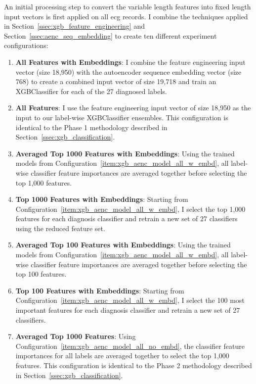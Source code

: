 \documentclass[\main/thesis.tex]{subfiles}
\begin{document}
An initial processing step to convert the variable length features into fixed length input vectors is first applied on all \gls{ecg} records.
I combine the techniques applied in Section~\ref{ssec:xgb_feature_engineering} and Section~\ref{ssec:aenc_seq_embedding} to create ten different experiment configurations:
\begin{enumerate}
    \item \label{item:xgb_aenc_model_all_w_embd} \textbf{All Features with Embeddings}: I combine the feature engineering input vector (size 18,950) with the autoencoder sequence embedding vector (size 768) to create a combined input vector of size 19,718 and train an XGBClassifier for each of the 27 diagnosed labels.
    \item \label{item:xgb_aenc_model_all_no_embd} \textbf{All Features}: I use the feature engineering input vector of size 18,950 as the input to our label-wise XGBClassifier ensembles. This configuration is identical to the Phase 1 methodology described in Section~\ref{ssec:xgb_classification}.
    \item \label{item:xgb_aenc_model_avgd_top_1000_w_embd} \textbf{Averaged Top 1000 Features with Embeddings}: Using the trained models from Configuration~\ref{item:xgb_aenc_model_all_w_embd}, all label-wise classifier feature importances are averaged together before selecting the top 1,000 features.
    \item \label{item:xgb_aenc_model_top_1000_w_embd} \textbf{Top 1000 Features with Embeddings}: Starting from Configuration~\ref{item:xgb_aenc_model_all_w_embd}, I select the top 1,000 features for each diagnosis classifier and retrain a new set of 27 classifiers using the reduced feature set.
    \item \label{item:xgb_aenc_model_avgd_top_100_w_embd} \textbf{Averaged Top 100 Features with Embeddings}: Using the trained models from Configuration~\ref{item:xgb_aenc_model_all_w_embd}, all label-wise classifier feature importances are averaged together before selecting the top 100 features.
    \item \label{item:xgb_aenc_model_top_100_w_embd} \textbf{Top 100 Features with Embeddings}: Starting from Configuration~\ref{item:xgb_aenc_model_all_w_embd}, I select the 100 most important features for each diagnosis classifier and retrain a new set of 27 classifiers.
    \item \label{item:xgb_aenc_model_avgd_top_1000_no_embd} \textbf{Averaged Top 1000 Features}: Using Configuration~\ref{item:xgb_aenc_model_all_no_embd}, the classifier feature importances for all labels are averaged together to select the top 1,000 features. This configuration is identical to the Phase 2 methodology described in Section~\ref{ssec:xgb_classification}.

\end{enumerate}
\end{document}
